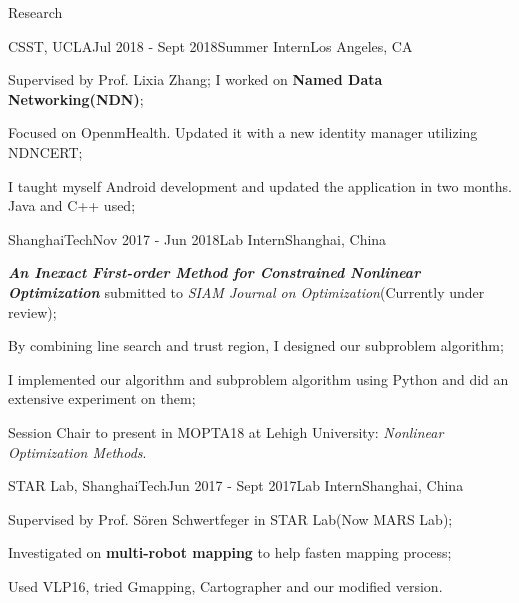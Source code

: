 \documentclass{resume} %
\begin{document}
\begin{rSection}{Research}

\begin{rSubsection}
  {CSST, UCLA}{Jul 2018 - Sept 2018}{Summer Intern}{Los Angeles, CA}
    \item Supervised by Prof. Lixia Zhang; I worked on \textbf{Named Data Networking(NDN)}; 
    \item Focused on OpenmHealth. Updated it with a new identity manager utilizing NDNCERT;
    \item I taught myself Android development and updated the application in two months. Java and C++ used;
\end{rSubsection}


\begin{rSubsection}
  {ShanghaiTech}{Nov 2017 - Jun 2018}{Lab Intern}{Shanghai, China}
    \item \textbf{\textit{An Inexact First-order Method for Constrained Nonlinear Optimization}} submitted to \textit{SIAM Journal on Optimization}(Currently under review);
    \item By combining line search and trust region, I designed our subproblem algorithm;
    \item I implemented our algorithm and subproblem algorithm using Python and did an extensive experiment on them;
    \item Session Chair to present in MOPTA18 at Lehigh University: \textit{Nonlinear Optimization Methods}.
    
\end{rSubsection}


\begin{rSubsection}
  {STAR Lab, ShanghaiTech}{Jun 2017 - Sept 2017}{Lab Intern}{Shanghai, China}
    \item Supervised by Prof. Sören Schwertfeger in STAR Lab(Now MARS Lab);
    \item Investigated on \textbf{multi-robot mapping} to help fasten mapping process;
    \item Used VLP16, tried Gmapping, Cartographer and our modified version.
\end{rSubsection}

\end{rSection}
\end{document}
